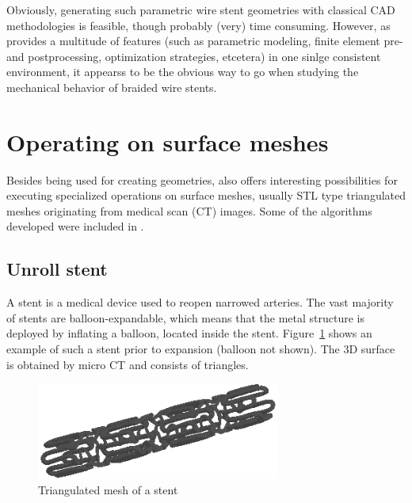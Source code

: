

Obviously, generating such parametric wire stent geometries with classical CAD methodologies is feasible, though probably (very) time consuming. However, as \pyf provides a multitude of features (such as parametric modeling, finite element pre- and postprocessing, optimization strategies, etcetera) in one sinlge consistent environment, it appearss to be the obvious way to go when studying the mechanical behavior of braided wire stents.

\newpage

\section{Operating on surface meshes}
\label{sec:operating-surf-mesh}

Besides being used for creating geometries, \pyf also offers interesting possibilities for executing specialized operations on surface meshes, usually STL type triangulated meshes originating from medical scan (CT) images. Some of the algorithms developed were included in \pyf.

\subsection{Unroll stent}
\label{sec:unroll-stent}

A stent is a medical device used to reopen narrowed arteries. The vast majority of stents are balloon-expandable, which means that the metal structure is deployed by inflating a balloon, located inside the stent. Figure~\ref{fig:cypher-stent} shows an example of such a stent prior to expansion (balloon not shown). The 3D surface is obtained by micro CT and consists of triangles.

\begin{figure}[ht]
  \centering
  \begin{makeimage}
  \end{makeimage}
  \begin{latexonly}
    \includegraphics[width=8cm]{images/cypher-stent}
  \end{latexonly}
  \begin{htmlonly}
  \end{htmlonly}  
  \caption{Triangulated mesh of a stent}
  \label{fig:cypher-stent}
\end{figure}

